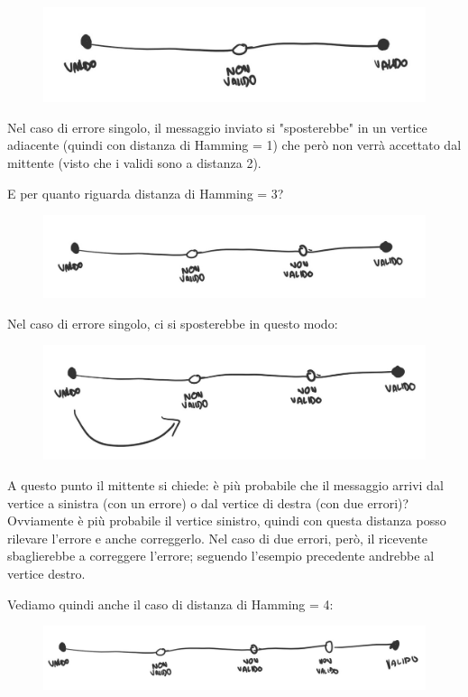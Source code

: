 \begin{figure}[H]
	\centering
	\includegraphics[width=0.7\linewidth]{immagini/img9}
\end{figure}
Nel caso di errore singolo, il messaggio inviato si "sposterebbe" in un vertice adiacente (quindi con distanza di Hamming = 1) che però non verrà accettato dal mittente (visto che i validi sono a distanza 2).

E per quanto riguarda distanza di Hamming = 3?

\begin{figure}[H]
	\centering
	\includegraphics[width=0.7\linewidth]{immagini/img10}
\end{figure}

Nel caso di errore singolo, ci si sposterebbe in questo modo:

\begin{figure}[H]
	\centering
	\includegraphics[width=0.7\linewidth]{immagini/img11}
\end{figure}

A questo punto il mittente si chiede: è più probabile che il messaggio arrivi dal vertice a sinistra (con un errore) o dal vertice di destra (con due errori)? Ovviamente è più probabile il vertice sinistro, quindi con questa distanza posso rilevare l'errore e anche correggerlo.
Nel caso di due errori, però, il ricevente sbaglierebbe a correggere l'errore; seguendo l'esempio precedente andrebbe al vertice destro.

Vediamo quindi anche il caso di distanza di Hamming = 4:

\begin{figure}[H]
	\centering
	\includegraphics[width=0.7\linewidth]{immagini/img12}
\end{figure}

